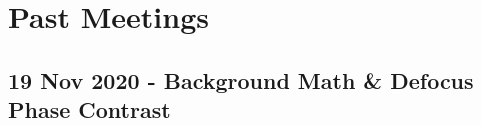 \documentclass[11pt, oneside]{article}   	%
\begin{document}



\pagebreak
\section{Past Meetings}


\subsection{19 Nov 2020 - Background Math \& Defocus Phase Contrast}
\end{document}
